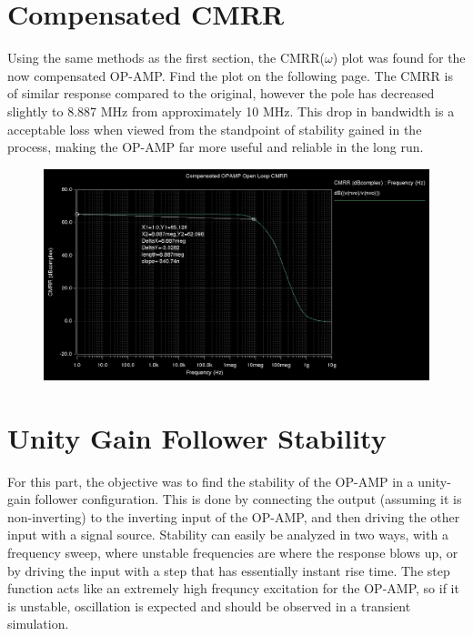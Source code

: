 \documentclass[12pt]{article}
\begin{document}
\section{Compensated CMRR}
Using the same methods as the first section, the CMRR($\omega$) plot was found for the now compensated OP-AMP. Find the plot on the following page. The CMRR is of similar response compared to the original, however the pole has decreased slightly to 8.887 MHz from approximately 10 MHz. This drop in bandwidth is a acceptable loss when viewed from the standpoint of stability gained in the process, making the OP-AMP far more useful and reliable in the long run.
\FloatBarrier
\begin{figure}[h!]
\begin{center}
 \includegraphics[scale=0.27]{./compcmrr.png}
\end{center}
\end{figure}
\FloatBarrier

\section{Unity Gain Follower Stability}
For this part, the objective was to find the stability of the OP-AMP in a unity-gain follower configuration. This is done by connecting the output (assuming it is non-inverting) to the inverting input of the OP-AMP, and then driving the other input with a signal source. Stability can easily be analyzed in two ways, with a frequency sweep, where unstable frequencies are where the response blows up, or by driving the input with a step that has essentially instant rise time. The step function acts like an extremely high frequncy excitation for the OP-AMP, so if it is unstable, oscillation is expected and should be observed in a transient simulation.
\end{document}
